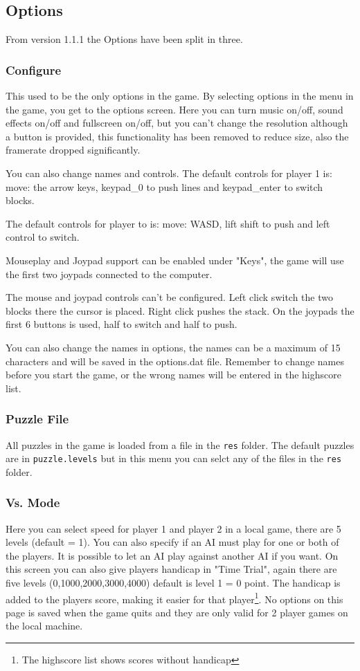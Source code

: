 \documentclass[11pt,a4paper]{article}
\begin{document}
\subsection{Options}
From version 1.1.1 the Options have been split in three.
\subsubsection{Configure}
This used to be the only options in the game.
By selecting options in the menu in the game, you get to the
options screen. Here you can turn music on/off, sound effects
on/off and fullscreen on/off, but you can't change the
resolution although a button is provided, this functionality has
been removed to reduce size, also the framerate dropped
significantly.

You can also change names and controls. The default controls for
player 1 is: move: the arrow keys, keypad\_0 to push lines and
keypad\_enter to switch blocks.

The default controls for player to is: move: WASD, lift shift to
push and left control to switch.

Mouseplay and Joypad support can be enabled under "Keys", the game
will use the first two joypads connected to the computer.

The mouse and joypad controls can't be configured. Left click
switch the two blocks there the cursor is placed. Right click
pushes the stack. On the joypads the first 6 buttons is used, half
to switch and half to push.

You can also change the names in options, the names can be a
maximum of 15 characters and will be saved in the options.dat
file. Remember to change names before you start the game, or the
wrong names will be entered in the highscore list.
\subsubsection{Puzzle File}
All puzzles in the game is loaded from a file in the \verb+res+ folder. The default puzzles are in \verb+puzzle.levels+ but in this menu you can selct any of the files in the \verb+res+ folder.
\subsubsection{Vs. Mode}
Here you can select speed for player 1 and player 2 in a local game, there are 5 levels (default = 1). You can also specify if an AI must play for one or both of the players. It is possible to let an AI play against another AI if you want. On this screen you can also give players handicap in "Time Trial", again there are five levels (0,1000,2000,3000,4000) default is level 1 = 0 point. The handicap is added to the players score, making it easier for that player\footnote{The highscore list shows scores without handicap}. \newline
No options on this page is saved when the game quits and they are only valid for 2 player games on the local machine.
\end{document}
